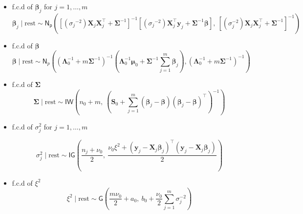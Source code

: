 \begin{itemize}
    \item f.c.d of $\bm{\beta}_j$ for $j=1,\dots,m$
    \begin{equation}
        \label{HLRM_MCMC_Betaj}
        \bm{\beta}_j \mid \text{rest} \sim \mathsf{N_p} \left( 
\left[ ({\sigma_j}^{-2}) \bm{X}_{j} \bm{X}_{j}^\top + \bm{\Sigma}^{-1} \right]^{-1}
\left[ ({\sigma_j}^{-2}) \bm{X}_{j}^\top \bm{y}_{j} + \bm{\Sigma}^{-1} \bm{\beta} \right], \ 
\left[ (\sigma_j^{-2}) \bm{X}_{j} \bm{X}_{j}^\top  + \bm{\Sigma}^{-1} \right]^{-1}
\right)
    \end{equation}
    \item f.c.d of $\bm{\beta}$
    \begin{equation}
        \label{HLRM_MCMC_Beta}
        \bm{\beta} \mid \text{rest} \sim \mathsf{N}_p \left(
\left( \bm{\Lambda}_0^{-1} + m \bm{\Sigma}^{-1} \right)^{-1}
\left( \bm{\Lambda}_0^{-1} \bm{\mu}_0 + \bm{\Sigma}^{-1} \sum_{j=1}^{m} \bm{\beta}_j \right),
\left( \bm{\Lambda}_0^{-1} + m \bm{\Sigma}^{-1} \right)^{-1}\right)
    \end{equation}
    \item f.c.d of $\bm{\Sigma}$
    \begin{equation}
        \label{HLRM_MCMC_Sigma}
        \bm{\Sigma} \mid \text{rest} \sim \mathsf{IW} \left( 
n_0 + m,\ 
\left( \bm{S}_0 + \sum_{j=1}^{m} (\bm{\beta}_j - \bm{\beta})(\bm{\beta}_j - \bm{\beta})^\top\right)^{-1}
\right)
    \end{equation}
    
\item f.c.d of $\sigma_j^2$ for $j=1,\dots,m$
    
    \begin{equation}
        \label{HLRM_MCMC_sigma2j}
        \sigma_j^2 \mid \text{rest} \sim \mathsf{IG} \left( 
\frac{n_j + \nu_0}{2},\ 
\frac{ \nu_0 \xi^2 +  (\bm{y}_{j} - \bm{X}_{j} \bm{\beta}_j)^\top(\bm{y}_{j} - \bm{X}_{j} \bm{\beta}_j)}{2} 
\right)
    \end{equation}
    \item f.c.d of $\xi^2$
    \begin{equation}
        \label{HLRM_MCMC_xi2}
        \xi^2 \mid \text{rest} \sim \mathsf{G} \left(
\frac{m \nu_0}{2} + a_0,\ 
b_0 + \frac{\nu_0}{2} \sum_{j=1}^{m} \sigma_j^{-2}
\right)
    \end{equation}
\end{itemize}

